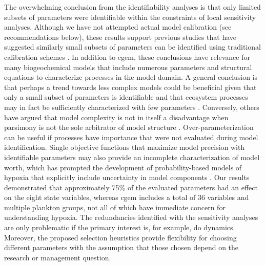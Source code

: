 \documentclass[letterpaper,12pt,oneside]{article}\usepackage[]{graphicx}\usepackage[]{color}
\begin{document}
The overwhelming conclusion from the identifiability analyses is that only limited subsets of parameters were identifiable within the constraints of local sensitivity analyses. Although we have not attempted actual model calibration (see recommendations below), these results support previous studies that have suggested similarly small subsets of parameters can be identified using traditional calibration schemes \citep[e.g.,][]{Wheater86,Ye97,Omlin01}.  In addition to \ac{cgem}, these conclusions have relevance for many biogeochemical models that include numerous parameters and structural equations to characterize processes in the model domain.  A general conclusion is that perhaps a trend towards less complex models could be beneficial given that only a small subset of parameters is identifiable and that ecosystem processes may in fact be sufficiently characterized with few parameters \citep{Ye97}.  Conversely, others have argued that model complexity is not in itself a disadvantage when parsimony is not the sole arbitrator of model structure \citep{Reichert97}. Over-parameterization can be useful if processes have importance that were not evaluated during model identification.  Single objective functions that maximize model precision with identifiable parameters may also provide an incomplete characterization of model worth, which has prompted the development of probability-based models of hypoxia that explicitly include uncertainty in model components \citep[e.g.][]{Obenour15}.  Our results demonstrated that approximately 75\% of the evaluated parameters had an effect on the eight state variables, whereas \ac{cgem} includes a total of 36 variables and multiple plankton groups, not all of which have immediate concern for understanding hypoxia. The redundancies identified with the sensitivity analyses are only problematic if the primary interest is, for example, \ac{do} dynamics.  Moreover, the proposed selection heuristics provide flexibility for choosing different parameters with the assumption that those chosen depend on the research or management question. 
\end{document}
